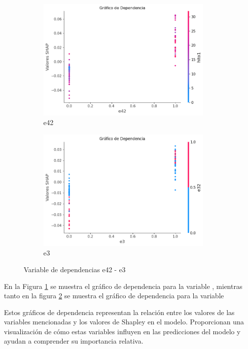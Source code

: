 \begin{figure}[H]

    \begin{subfigure}{0.5\textwidth}
        \includegraphics[width=0.9\linewidth, height=6cm]{img/shap_rf/e42.png}
        \caption{e42}
        \label{fig:dependencia_e42}
    \end{subfigure}
    \begin{subfigure}{0.5\textwidth}
        \includegraphics[width=0.9\linewidth, height=6cm]{img/shap_rf/e3.png}
        \caption{e3}
        \label{fig:dependencia_e3}
    \end{subfigure}

    \caption{Variable de dependencias e42 - e3}
    \label{fig:image2}
\end{figure}

En la Figura \ref{fig:dependencia_e42} se muestra el gráfico de dependencia para la variable , mientras tanto en la figura \ref{fig:dependencia_e3} se muestra el gráfico de dependencia para la variable 


Estos gráficos de dependencia representan la relación entre los valores de las variables mencionadas y los valores de Shapley en el modelo. Proporcionan una visualización de cómo estas variables influyen en las predicciones del modelo y ayudan a comprender su importancia relativa.

